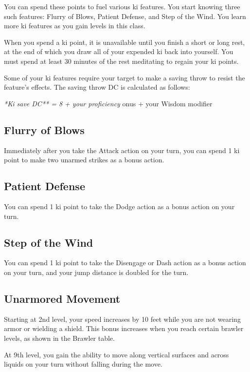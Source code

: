 You can spend these points to fuel various ki features. You start knowing three such features: Flurry of Blows, Patient Defense, and Step of the Wind. You learn more ki features as you gain levels in this class.

When you spend a ki point, it is unavailable until you finish a short or long rest, at the end of which you draw all of your expended ki back into yourself. You must spend at least 30 minutes of the rest meditating to regain your ki points.

Some of your ki features require your target to make a saving throw to resist the feature’s effects. The saving throw DC is calculated as follows:

\textit{*Ki save DC** = 8 + your proficiency }onus + your Wisdom modifier

\subsection{Flurry of Blows}

Immediately after you take the Attack action on your turn, you can spend 1 ki point to make two unarmed strikes as a bonus action.

\subsection{Patient Defense}

You can spend 1 ki point to take the Dodge action as a bonus action on your turn.

\subsection{Step of the Wind}

You can spend 1 ki point to take the Disengage or Dash action as a bonus action on your turn, and your jump distance is doubled for the turn.

\subsection{Unarmored Movement}

Starting at 2nd level, your speed increases by 10 feet while you are not wearing armor or wielding a shield. This bonus increases when you reach certain brawler levels, as shown in the Brawler table.

At 9th level, you gain the ability to move along vertical surfaces and across liquids on your turn without falling during the move.

